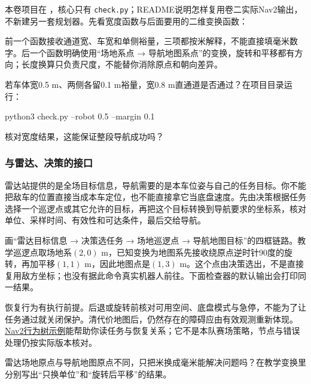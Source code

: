 本卷项目在 ，核心只有 \texttt{check.py}；README说明怎样复用卷二实际Nav2输出，不新建另一套规划器。先看宽度函数与后面要用的二维变换函数：


前一个函数接收通道宽、车宽和单侧裕量，三项都按米解释，不能直接填毫米数字。后一个函数明确使用“场地系点 → 导航地图系点”的变换，旋转和平移都有方向；长度换算只负责尺度，不能替你消除原点和朝向差异。

\begin{exercise}
\label{v3-ex-nav-3}
若车体宽0.5 m、两侧各留0.1 m裕量，宽0.8 m直通道是否通过？在项目目录运行：
\begin{tbash}
python3 check.py --robot 0.5 --margin 0.1
\end{tbash}
核对宽度结果，这能保证整段导航成功吗？
\end{exercise}

\subsubsection{与雷达、决策的接口}

雷达站提供的是全场目标信息，导航需要的是本车位姿与自己的任务目标。你不能把敌车的位置直接当成本车定位，也不能直接拿它当底盘速度。先由决策根据任务选择一个巡逻点或其它允许的目标，再把这个目标转换到导航要求的坐标系，核对单位、采样时间、有效性和可达条件，最后交给导航。

\begin{example}[核对决策接口]
画“雷达目标信息 → 决策选任务 → 场地巡逻点 → 导航地图目标”的四框链路。教学巡逻点取场地系$(2,0)$ m，已知变换为地图系先接收绕原点逆时针90度的旋转，再加平移$(1,1)$ m，因此地图点是$(1,3)$ m。这个点由决策选出，不是直接复用敌方坐标；也没有据此命令真实机器人前往。下面检查器的默认输出会打印同一结果。
\end{example}

\begin{note}
恢复行为有执行前提。后退或旋转前核对可用空间、底盘模式与急停，不能为了让任务通过就关闭保护。清代价地图后，仍然存在的障碍应由有效观测重新体现。\href{https://docs.nav2.org/jazzy/getting_started/nav2_behavior_trees/trees/nav_through_poses_recovery/}{Nav2行为树示例}能帮助你读任务与恢复关系；它不是本队赛场策略，节点与错误处理仍按实际版本核对。
\end{note}

\begin{exercise}
\label{v3-ex-nav-4}
雷达场地原点与导航地图原点不同，只把米换成毫米能解决问题吗？在教学变换里分别写出“只换单位”和“旋转后平移”的结果。
\end{exercise}

